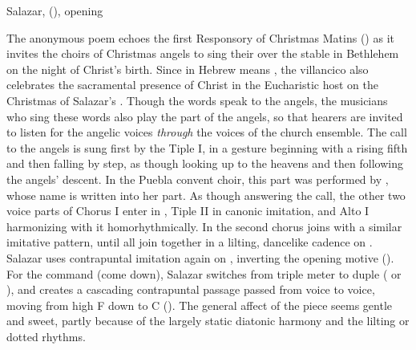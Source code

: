 
\begin{musicexample}
    \caption{Salazar, 
    (), opening}
    \label{mus:Salazar-Angelicos_coros-1}
\end{musicexample}

The anonymous poem echoes the first Responsory of Christmas Matins
() as it invites the choirs of Christmas
angels to sing their  over the stable in Bethlehem on the night
of Christ's birth.
Since  in Hebrew means , the
villancico also celebrates the sacramental presence of Christ in the
Eucharistic host on the Christmas of Salazar's .
Though the words speak to the angels, the musicians who sing these words also
play the part of the angels, so that hearers are invited to listen for the
angelic voices \emph{through} the voices of the church ensemble. 
The call to the angels is sung first by the Tiple I, in a gesture beginning
with a rising fifth and then falling by step, as though looking up to the
heavens and then following the angels' descent.
In the Puebla convent choir, this part was performed by ,
whose name is written into her part.
As though answering the call, the other two voice parts of Chorus I enter in
, Tiple II in canonic imitation, and Alto I harmonizing with it
homorhythmically. 
In  the second chorus joins with a similar imitative
pattern, until all join together in a lilting, dancelike cadence on
.
Salazar uses contrapuntal imitation again on ,
inverting the opening motive ().
For the command  (come down), Salazar switches from \meterCZ{}
triple meter to duple (\meterC{} or ), and creates a cascading
contrapuntal passage passed from voice to voice, moving from high F
down to C ().
The general affect of the piece seems gentle and sweet, partly because of the
largely static diatonic harmony and the lilting or dotted rhythms.


